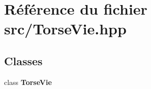 \section{Référence du fichier src/\-Torse\-Vie.hpp}
\label{_torse_vie_8hpp}
\subsection*{Classes}
\begin{DoxyCompactItemize}
\item 
class {\bf Torse\-Vie}
\end{DoxyCompactItemize}
